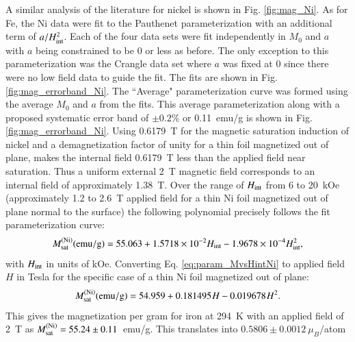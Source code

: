 \documentclass[preprint,12pt]{elsarticle}
\begin{document}
A similar analysis of the literature for nickel is shown in Fig. \ref{fig:mag_Ni}. As for Fe, the Ni data were fit to the Pauthenet parameterization with an additional term of $a/H_{\rm int}^2$. Each of the four data sets were fit independently in $M_0$ and $a$ with $a$ being constrained to be 0 or less as before. The only exception to this parameterization was the Crangle data set where $a$ was fixed at 0 since there were no low field data to guide the fit. The fits are shown in Fig. \ref{fig:mag_errorband_Ni}. The ``Average" parameterization curve was formed using the average $M_0$ and $a$ from the fits. This average parameterization along with a proposed systematic error band of $\pm0.2$\% or 0.11~emu/g is shown in Fig.\ref{fig:mag_errorband_Ni}.  Using 0.6179~T for the magnetic saturation induction of nickel and a demagnetization factor of unity for a thin foil magnetized out of plane, makes the internal field 0.6179~T less than the applied field near saturation. Thus a uniform external 2~T magnetic field corresponds to an internal field of approximately 1.38~T. Over the range of $H_{\rm int}$ from 6 to 20~kOe (approximately 1.2 to 2.6~T applied field for a thin Ni foil magnetized out of plane normal to the surface) the following polynomial precisely follows the fit parameterization curve: 
\begin{equation}
M_{\rm sat}^{\rm (Ni)}({\rm emu/g})=55.063+1.5718\times 10^{-2}H_{\rm int}-1.9678\times 10^{-4}H_{\rm int}^2,
\label{eq:param_MvsHintNi}
\end{equation}
with $H_{\rm int}$ in units of kOe. Converting Eq. \ref{eq:param_MvsHintNi} to applied field $H$ in Tesla for the specific case of a thin Ni foil magnetized out of plane:
\begin{equation}
M_{\rm sat}^{\rm (Ni)}({\rm emu/g})=54.959+0.181495\hspace{.06667em}H-0.019678\hspace{.06667em}H^2.
\end{equation}
This gives the magnetization per gram for iron at 294~K with an applied field of 2~T as $M_{\rm sat}^{\rm (Ni)}=55.24\pm0.11$~emu/g. This translates into $0.5806\pm0.0012~\mu_B/$atom 
\end{document}
